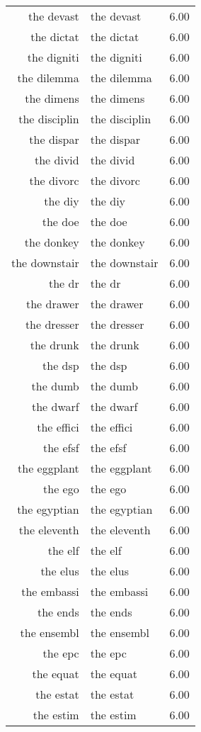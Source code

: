 \begin{table}[ht]
\begin{tabular}{rlr}
  the devast & the devast & 6.00 \\ 
  the dictat & the dictat & 6.00 \\ 
  the digniti & the digniti & 6.00 \\ 
  the dilemma & the dilemma & 6.00 \\ 
  the dimens & the dimens & 6.00 \\ 
  the disciplin & the disciplin & 6.00 \\ 
  the dispar & the dispar & 6.00 \\ 
  the divid & the divid & 6.00 \\ 
  the divorc & the divorc & 6.00 \\ 
  the diy & the diy & 6.00 \\ 
  the doe & the doe & 6.00 \\ 
  the donkey & the donkey & 6.00 \\ 
  the downstair & the downstair & 6.00 \\ 
  the dr & the dr & 6.00 \\ 
  the drawer & the drawer & 6.00 \\ 
  the dresser & the dresser & 6.00 \\ 
  the drunk & the drunk & 6.00 \\ 
  the dsp & the dsp & 6.00 \\ 
  the dumb & the dumb & 6.00 \\ 
  the dwarf & the dwarf & 6.00 \\ 
  the effici & the effici & 6.00 \\ 
  the efsf & the efsf & 6.00 \\ 
  the eggplant & the eggplant & 6.00 \\ 
  the ego & the ego & 6.00 \\ 
  the egyptian & the egyptian & 6.00 \\ 
  the eleventh & the eleventh & 6.00 \\ 
  the elf & the elf & 6.00 \\ 
  the elus & the elus & 6.00 \\ 
  the embassi & the embassi & 6.00 \\ 
  the ends & the ends & 6.00 \\ 
  the ensembl & the ensembl & 6.00 \\ 
  the epc & the epc & 6.00 \\ 
  the equat & the equat & 6.00 \\ 
  the estat & the estat & 6.00 \\ 
  the estim & the estim & 6.00 \\ 

\end{tabular}
\end{table}
